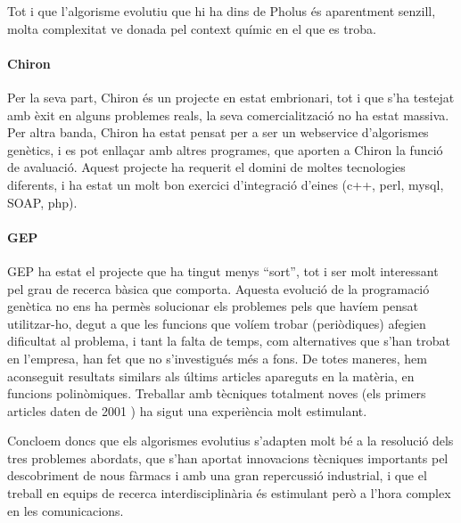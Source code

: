 Tot i que l'algorisme evolutiu que hi ha dins de Pholus és aparentment senzill,
molta complexitat ve donada pel context químic en el que es troba.

\paragraph{Chiron} %
\label{par:Chiron}

Per la seva part, Chiron és un projecte en estat embrionari, tot i que s'ha testejat amb èxit en alguns problemes reals, la seva comercialització no ha estat massiva.
Per altra banda, Chiron ha estat pensat per a ser un webservice d'algorismes genètics,
i es pot enllaçar amb altres programes, que aporten a Chiron la funció de
avaluació.  Aquest projecte ha requerit el domini de moltes tecnologies
diferents, i ha estat un molt bon exercici d'integració d'eines
(c++, perl, mysql, SOAP, php).

\paragraph{GEP} %
\label{par:GEP}
GEP ha estat el projecte que ha tingut menys ``sort'', tot i ser molt
interessant pel grau de recerca bàsica que comporta.  Aquesta evolució de la programació genètica no ens ha permès solucionar els problemes pels que havíem pensat utilitzar-ho, degut a que les funcions que volíem trobar (periòdiques) afegien
dificultat al problema, i tant la falta de temps, com alternatives que s'han
trobat en l'empresa, han fet que no s'investigués més a fons.  De totes maneres,
hem aconseguit resultats similars als últims articles apareguts en la matèria,
en funcions polinòmiques.  Treballar amb tècniques totalment noves (els primers
articles daten de 2001 \cite{ferreira:2001}) ha sigut una experiència molt
estimulant.

Concloem doncs que els algorismes evolutius s'adapten molt bé a la resolució dels tres problemes abordats, que s'han aportat innovacions tècniques importants pel descobriment de nous fàrmacs i amb una gran repercussió industrial, i que el treball en equips de recerca interdisciplinària és estimulant però a l'hora complex en les comunicacions.



